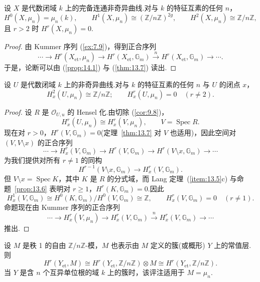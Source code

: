 \begin{proposition}\label{prop:14.2}
设 $X$ 是代数闭域 $k$ 上的完备连通非奇异曲线.对与 $k$ 的特征互素的任何 $n$，
\[
H^{0}(X, \mu_n) = \mu_n(k), \qquad H^{1}(X, \mu_n) \cong (\mathbb{Z}/n\mathbb{Z})^{2g}, \qquad H^{2}(X, \mu_n) \cong \mathbb{Z}/n\mathbb{Z},
\]
且 $r > 2$ 时 $H^{r}(X, \mu_n) = 0$.
\end{proposition}

\begin{proof}
由 Kummer 序列 (\ref{ex:7.9})，得到正合序列
\[
\cdots \to H^{r}(X_{\mathrm{et}}, \mu_n) \to H^{r}(X_{\mathrm{et}}, \mathbb{G}_{m}) \xrightarrow{n} H^{r}(X_{\mathrm{et}}, \mathbb{G}_{m}) \to \cdots.
\]
于是，论断可以由 (\ref{prop:14.1}) 与 (\ref{thm:13.7}) 读出.
\end{proof}

\begin{proposition}\label{prop:14.3}
设 $U$ 是代数闭域 $k$ 上的非奇异曲线.对与 $k$ 的特征互素的任何 $n$ 与 $U$ 的闭点 $x$，
\[
H^{2}_{x}(U, \mu_n) \cong \mathbb{Z}/n\mathbb{Z}; \qquad H^{r}_{x}(U, \mu_n) = 0 \quad (r \neq 2).
\]
\end{proposition}

\begin{proof}
设 $R$ 是 $\mathcal{O}_{U, u}$ 的 Hensel 化.由切除 (\ref{cor:9.8})，
\[
H^{r}_{x}(U, \mu_n) \cong H^{r}_{x}(V, \mu_n), \qquad V = \operatorname{Spec} R.
\]
现在对 $r > 0$，$H^{r}(V, \mathbb{G}_{m}) = 0$(定理~\ref{thm:13.7} 对 $V$ 也适用)，因此空间对 $(V, V \setminus x)$ 的正合序列
\[
\cdots \to H^{r}_{x}(V, \mathbb{G}_{m}) \to H^{r}(V, \mathbb{G}_{m}) \to H^{r}(V \setminus x, \mathbb{G}_{m}) \to \cdots
\]
为我们提供对所有 $r \neq 1$ 的同构
\[
H^{r-1}(V \setminus x, \mathbb{G}_{m}) \to H^{r}_{x}(V, \mathbb{G}_{m}).
\]
但 $V \setminus x = \operatorname{Spec} K$，其中 $K$ 是 $R$ 的分式域，而 Lang 定理~(\ref{item:13.5}c) 与命题~\ref{prop:13.6} 表明对 $r \geq 1$，$H^{r}(K, \mathbb{G}_{m}) = 0$.因此
\[
H^{1}_{x}(V, \mathbb{G}_{m}) \cong H^{0}(K, \mathbb{G}_{m})/H^{0}(V, \mathbb{G}_{m}) \cong \mathbb{Z}, \qquad H^{r}_{x}(V, \mathbb{G}_{m}) = 0 \quad (r \neq 1).
\]
命题现在由 Kummer 序列的正合序列
\[
\cdots \to H^{r}_{x}(V, \mu_n) \to H^{r}_{x}(V, \mathbb{G}_{m}) \xrightarrow{n} H^{r}_{x}(V, \mathbb{G}_{m}) \to \cdots
\]
推出.
\end{proof}

\begin{remark}\label{rem:14.4}
设 $M$ 是秩 1 的自由 $\mathbb{Z}/n\mathbb{Z}$-模，$M$ 也表示由 $M$ 定义的簇(或概形) $Y$ 上的常值层.则
\[
H^{r}(Y_{\mathrm{et}}, M) \cong H^{r}(Y_{\mathrm{et}}, \mathbb{Z}/n\mathbb{Z}) \otimes M \cong H^{r}(Y_{\mathrm{et}}, \mathbb{Z}/n\mathbb{Z}).
\]
当 $Y$ 是含 $n$ 个互异单位根的域 $k$ 上的簇时，该评注适用于 $M = \mu_n$.
\end{remark}

